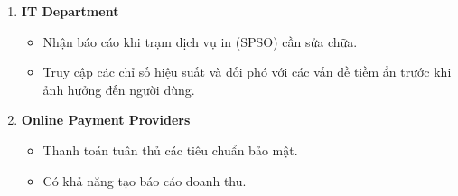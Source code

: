 \documentclass[a4paper]{article}
\begin{document}
\begin{enumerate}
\begin{itemize}
            \end{itemize}
        \item {\textbf{IT Department} }
            \begin{itemize}
                \item Nhận báo cáo khi trạm dịch vụ in (SPSO) cần sửa chữa.
                \item Truy cập các chỉ số hiệu suất và đối phó với các vấn đề tiềm ẩn trước khi ảnh hưởng đến người dùng.
            \end{itemize}
        \item {\textbf{Online Payment Providers} }
            \begin{itemize}
                \item Thanh toán tuân thủ các tiêu chuẩn bảo mật.
                \item Có khả năng tạo báo cáo doanh thu.
            \end{itemize}
    \end{enumerate}
        
\end{document}
